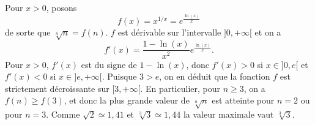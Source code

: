 Pour $x>0$, posons 
\[ f(x)=x^{ 1/x} = e^{\frac{\ln(x)}{x}}\]
de sorte que $\sqrt[n]{n}=f(n)$. $f$ est dérivable sur l'intervalle $]0,+\infty[$ et on a 
\[ f'(x)=\frac{1-\ln(x)}{x^2}e^{\frac{\ln(x)}{x}}.\]
Pour $x>0$, $f'(x)$ est du signe de $1-\ln(x)$, donc $f'(x)>0$ si $x \in ]0,e[$ et $f'(x)<0$ si $x\in ]e,+\infty[$. Puisque $3>e$, on en déduit que la fonction $f$ est strictement décroissante sur $[3,+\infty[$. En particulier, pour $n \geqslant 3$, on a $f(n) \geqslant f(3)$, et donc la plus grande valeur de $\sqrt[n]{n}$ est atteinte pour $n=2$ ou pour $n=3$. Comme $\sqrt{2} \simeq 1,41$ et $\sqrt[3]{3} \simeq 1,44$ la valeur maximale vaut $\sqrt[3]{3}$.